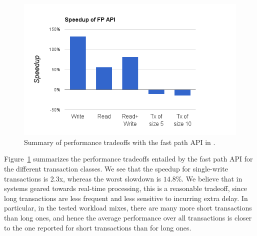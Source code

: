 \begin{figure}[h]
\includegraphics[width=.5\textwidth]{figs/speedup.png}
\caption{Summary of performance tradeoffs with the fast path API in {\sys}.}
\label{fig:fp-tradeoff}
\end{figure}


Figure~\ref{fig:fp-tradeoff} summarizes the performance tradeoffs entailed by the fast path API
for the different transaction classes. 
We see that the speedup for single-write transactions is 2.3x, whereas the worst slowdown is $14.8\%$. 
We believe that in systems geared towards real-time processing, this is a reasonable tradeoff, since long transactions 
are less frequent and less sensitive to incurring extra delay.
In particular, in the tested workload mixes, there are many more short transactions than long ones, and hence the average
performance over all transactions is closer to the one reported for short transactions than for long ones.  
